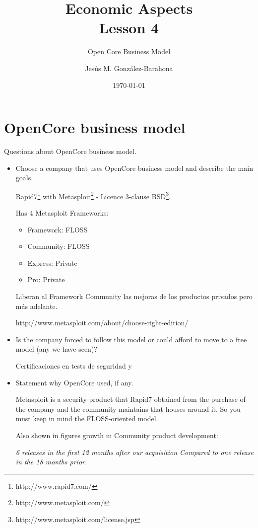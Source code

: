 \documentclass[11pt]{scrartcl}
\title{\textbf{Economic Aspects\\
                Lesson 4}}
\subtitle{Open Core Business Model}
\author{Jesús M. González-Barahona}
\date{\today}
\begin{document}
\maketitle

\section{OpenCore business model}

Questions about OpenCore business model.

\begin{itemize}

\item Choose a company that uses OpenCore business model and describe the main goals.

Rapid7\footnote{http://www.rapid7.com/} with Metasploit\footnote{http://www.metasploit.com/} - Licence 3-clause BSD\footnote{http://www.metasploit.com/license.jsp}.

Has 4 Metasploit Frameworks:
\begin{itemize}
    \item Framework: FLOSS
    \item Community: FLOSS
    \item Express: Private
    \item Pro: Private
\end{itemize}

Liberan al Framework Community las mejoras de los productos privados pero más adelante.

http://www.metasploit.com/about/choose-right-edition/

\item Is the company forced to follow this model or could afford to move to a free model (any we have seen)?

Certificaciones en tests de seguridad y

\item Statement why OpenCore used, if any.

\par Metasploit is a security product that Rapid7 obtained from the purchase of the company and the community maintains that houses around it. So you must keep in mind the FLOSS-oriented model.

\par Also shown in figures growth in Community product development:

\emph{6 releases in the first 12 months after our acquisition Compared to one release in the 18 months prior.}


\end{itemize}
\end{document}
